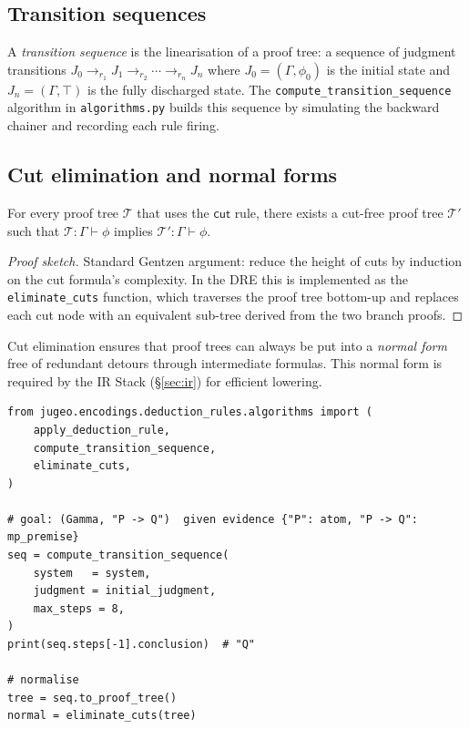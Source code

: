\documentclass[11pt]{article}
\newcommand{\PTree}{\mathcal{T}}              %
\newcommand{\Prov}[2]{#1 \vdash #2}           %
\newcommand{\CutR}{\ensuremath{\mathsf{cut}}}              %
\begin{document}
\subsection{Transition sequences}

A \emph{transition sequence} is the linearisation of a proof tree:
a sequence of judgment transitions $J_0 \to_{r_1} J_1 \to_{r_2}
\cdots \to_{r_n} J_n$ where $J_0 = (\Gamma, \phi_0)$ is the initial
state and $J_n = (\Gamma, \top)$ is the fully discharged state.
The \lstinline|compute_transition_sequence| algorithm in
\lstinline|algorithms.py| builds this sequence by simulating the
backward chainer and recording each rule firing.

\subsection{Cut elimination and normal forms}

\begin{theorem}\label{thm:cut-elim}
  For every proof tree $\PTree$ that uses the \CutR{} rule, there
  exists a cut-free proof tree $\PTree'$ such that
  $\PTree : \Prov{\Gamma}{\phi}$ implies $\PTree' : \Prov{\Gamma}{\phi}$.
\end{theorem}

\begin{proof}[Proof sketch]
  Standard Gentzen argument: reduce the height of cuts by induction on
  the cut formula's complexity.  In the \textsc{DRE} this is implemented
  as the \lstinline|eliminate_cuts| function, which traverses the proof
  tree bottom-up and replaces each cut node with an equivalent sub-tree
  derived from the two branch proofs.
\end{proof}

\noindent
Cut elimination ensures that proof trees can always be put into a
\emph{normal form} free of redundant detours through intermediate
formulas.  This normal form is required by the IR Stack (§\ref{sec:ir})
for efficient lowering.

\begin{lstlisting}[style=jugeo-python,
  caption={Building a proof tree via backward chaining.}]
from jugeo.encodings.deduction_rules.algorithms import (
    apply_deduction_rule,
    compute_transition_sequence,
    eliminate_cuts,
)

# goal: (Gamma, "P -> Q")  given evidence {"P": atom, "P -> Q": mp_premise}
seq = compute_transition_sequence(
    system   = system,
    judgment = initial_judgment,
    max_steps = 8,
)
print(seq.steps[-1].conclusion)  # "Q"

# normalise
tree = seq.to_proof_tree()
normal = eliminate_cuts(tree)
\end{lstlisting}
\end{document}
